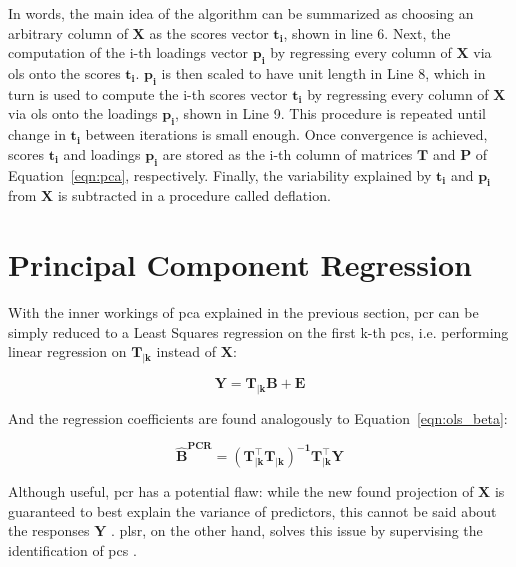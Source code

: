 In words, the main idea of the algorithm can be summarized as choosing an arbitrary column of $\mathbf{X}$ as the scores vector $\mathbf{t_i}$, shown in line 6. Next, the computation of the i-th loadings vector $\mathbf{p_i}$ by regressing every column of $\mathbf{X}$ via \acrshort{ols} onto the scores $\mathbf{t_i}$.  $\mathbf{p_i}$ is then scaled to have unit length in Line 8, which in turn is used to compute the i-th scores vector $\mathbf{t_i}$ by regressing every column of $\mathbf{X}$ via \acrshort{ols} onto the loadings $\mathbf{p_i}$, shown in Line 9. This procedure is repeated until change in $\mathbf{t_i}$ between iterations is small enough. Once convergence is achieved, scores $\mathbf{t_i}$ and loadings $\mathbf{p_i}$ are stored as the i-th column of matrices $\mathbf{T}$ and $\mathbf{P}$ of Equation~\ref{eqn:pca}, respectively. Finally, the variability explained by $\mathbf{t_i}$ and $\mathbf{p_i}$ from $\mathbf{X}$ is subtracted in a procedure called deflation.

\section{Principal Component Regression}
\label{sec:pcr}

With the inner workings of \acrshort{pca} explained in the previous section, \acrshort{pcr} can be simply reduced to a Least Squares regression on the first k-th \acrshort{pc}s, i.e. performing linear regression on $\mathbf{T_{|k}}$ instead of $\mathbf{X}$:
	
	\begin{equation}
		\label{eqn:pcr}
		\mathbf{Y = T_{|k} B + E}
	\end{equation}

And the regression coefficients are found analogously to Equation~\ref{eqn:ols_beta}:

\begin{equation}
	\label{eqn:beta-pcr}
	\mathbf{\hat{B}^{\text{PCR}} = (T_{|k}^\intercal T_{|k})^{-1}T_{|k}^\intercal Y}
\end{equation}

Although useful, \acrshort{pcr} has a potential flaw: while the new found projection of $\mathbf{X}$ is guaranteed to best explain the variance of predictors, this cannot be said about the responses $\mathbf{Y}$ \parencite{james2013introduction}. \acrshort{plsr}, on the other hand, solves this issue by supervising the identification of \acrshort{pc}s \parencite{james2013introduction}.
	
